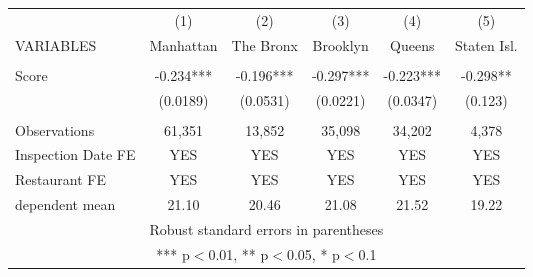\begin{tabular}{lccccc} \hline
 & (1) & (2) & (3) & (4) & (5) \\
VARIABLES & Manhattan & The Bronx & Brooklyn & Queens & Staten Isl. \\ \hline
 &  &  &  &  &  \\
Score & -0.234*** & -0.196*** & -0.297*** & -0.223*** & -0.298** \\
 & (0.0189) & (0.0531) & (0.0221) & (0.0347) & (0.123) \\
 &  &  &  &  &  \\
Observations & 61,351 & 13,852 & 35,098 & 34,202 & 4,378 \\
Inspection Date FE & YES & YES & YES & YES & YES \\
Restaurant FE & YES & YES & YES & YES & YES \\
 dependent mean & 21.10 & 20.46 & 21.08 & 21.52 & 19.22 \\ \hline
\multicolumn{6}{c}{ Robust standard errors in parentheses} \\
\multicolumn{6}{c}{ *** p$<$0.01, ** p$<$0.05, * p$<$0.1} \\
\end{tabular}
